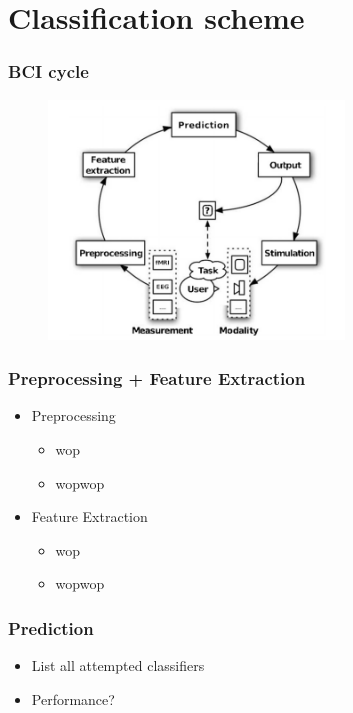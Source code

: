 \documentclass{beamer}
\begin{document}
\section{Classification scheme}

\begin{frame}
  \frametitle{BCI cycle}
  \begin{figure}
    \centering
    \includegraphics[width=0.7\textwidth]{bci_cycle.png}
  \end{figure}
 
\end{frame}

\begin{frame}
  \frametitle{Preprocessing + Feature Extraction}

  \begin{itemize}
    \item Preprocessing 
	\begin{itemize}
		\item wop
		\item wopwop
	\end{itemize}
    \item Feature Extraction
	\begin{itemize}
		\item wop
		\item wopwop
	\end{itemize}
  \end{itemize}

   

\end{frame}

\begin{frame}
  \frametitle{Prediction}

  \begin{itemize}
    \item List all attempted classifiers
    \item Performance?
  \end{itemize}
\end{frame}
\end{document}
